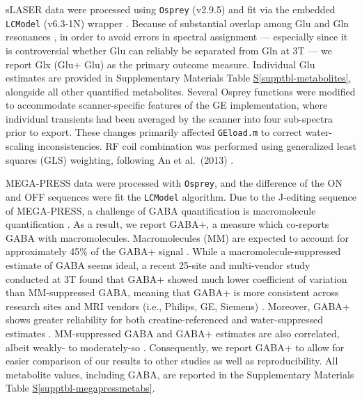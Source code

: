 \documentclass[
true
]{sn-jnl}
\newcommand*\quartosupptblref[1]{Table \hyperref[#1]{S\ref{#1}}}
\begin{document}
sLASER data were processed using \texttt{Osprey}
\citep{oeltzschnerOspreyOpenSourceProcessing2020} (v2.9.5) and fit via
the embedded \texttt{LCModel} (v6.3-1N) wrapper
\citep{provencherAutomaticQuantitationLocalized2001}. Because of
substantial overlap among Glu and Gln resonances
\citep{pasantaFunctionalMRSStudies2023, ramadanGlutamateGlutamineReview2013},
in order to avoid errors in spectral assignment --- especially since it
is controversial whether Glu can reliably be separated from Gln at 3T
\citep{zollnerComparisonDifferentLinearcombination2021, zollnerComparisonLinearCombination2022}
--- we report Glx (Glu+ Glu) as the primary outcome measure. Individual
Glu estimates are provided in Supplementary Materials
\quartosupptblref{supptbl-metabolites}, alongside all other quantified
metabolites. Several Osprey functions were modified to accommodate
scanner-specific features of the GE implementation, where individual
transients had been averaged by the scanner into four sub-spectra prior
to export. These changes primarily affected \texttt{GEload.m} to correct
water-scaling inconsistencies. RF coil combination was performed using
generalized least squares (GLS) weighting, following An et al.~(2013)
\citep{anCombinationMultichannelSinglevoxel2013, bouchardNoiseDecorrelationCoil2025}.

MEGA-PRESS data were processed with \texttt{Osprey}, and the difference
of the ON and OFF sequences were fit the \texttt{LCModel} algorithm. Due
to the J-editing sequence of MEGA-PRESS, a challenge of GABA
quantification is macromolecule quantification
\citep{harrisSpectralEditingMeasurementsGABA2015}. As a result, we
report GABA+, a measure which co-reports GABA with macromolecules.
Macromolecules (MM) are expected to account for approximately 45\% of
the GABA+ signal \citep{harrisSpectralEditingMeasurementsGABA2015}.
While a macromolecule-suppressed estimate of GABA seems ideal, a recent
25-site and multi-vendor study conducted at 3T found that GABA+ showed
much lower coefficient of variation than MM-suppressed GABA, meaning
that GABA+ is more consistent across research sites and MRI vendors
(i.e., Philips, GE, Siemens) \citep{mikkelsenBigGABAII2019}. Moreover,
GABA+ shows greater reliability for both creatine-referenced and
water-suppressed estimates
\citep{mikkelsenBigGABAEdited2017, mikkelsenBigGABAII2019}.
MM-suppressed GABA and GABA+ estimates are also correlated, albeit
weakly- to moderately-so
\citep{harrisSpectralEditingMeasurementsGABA2015, mikkelsenBigGABAII2019, mikkelsenBigGABAEdited2017}.
Consequently, we report GABA+ to allow for easier comparison of our
results to other studies as well as reproducibility. All metabolite
values, including GABA, are reported in the Supplementary Materials
\quartosupptblref{supptbl-megapressmetabs}.
\end{document}
